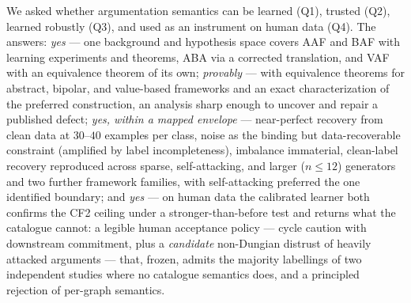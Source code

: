 \documentclass[review,12pt]{elsarticle}
\theoremstyle{definition}
\theoremstyle{remark}
\begin{document}
We asked whether argumentation semantics can be learned (Q1), trusted (Q2),
learned robustly (Q3), and used as an instrument on human data (Q4). The
answers: \emph{yes} --- one background and hypothesis space covers AAF and BAF
with learning experiments and theorems, ABA via a corrected translation, and
VAF with an equivalence theorem of its own; \emph{provably} --- with
equivalence theorems for abstract, bipolar, and value-based frameworks and an
exact characterization of the preferred construction, an analysis sharp enough to
uncover and repair a published defect; \emph{yes, within a mapped envelope} ---
near-perfect recovery from clean data at $30$--$40$ examples per class, noise
as the binding but data-recoverable constraint (amplified by label
incompleteness), imbalance immaterial, clean-label recovery reproduced across
sparse, self-attacking, and larger ($n{\le}12$) generators and two further
framework families, with self-attacking preferred the one identified boundary;
and \emph{yes} --- on
human data the calibrated learner both confirms the CF2 ceiling under a
stronger-than-before test and returns what the catalogue cannot: a legible
human acceptance policy --- cycle caution with downstream commitment, plus
a \emph{candidate} non-Dungian distrust of heavily attacked arguments ---
that, frozen, admits the majority labellings of two independent studies where
no catalogue semantics does, and a principled rejection of per-graph
semantics.
\end{document}
